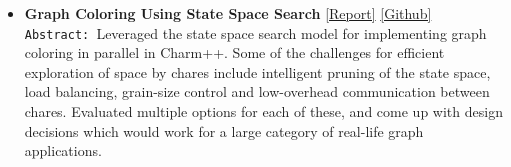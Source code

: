 \documentclass[9pt]{article}
\newenvironment{changemargin}[2]{%
  \begin{list}{}{%
    \setlength{\topsep}{0pt}%
    \setlength{\leftmargin}{#1}%
    \setlength{\rightmargin}{#2}%
    \setlength{\listparindent}{\parindent}%
    \setlength{\itemindent}{\parindent}%
    \setlength{\parsep}{\parskip}%
  }%
  \item[]}{\end{list}
}
\newenvironment{body} {
	\vspace*{-16pt}
	\begin{changemargin}{-0.25in}{-0.5in}
  }	
	{\end{changemargin}
}
\begin{document}
\begin{body}
\begin{itemize}
           \item \textbf{Graph Coloring Using State Space Search} 
           \href{http://webhost.engr.illinois.edu/~sdasgup3/Document/CS598_project_proposal.pdf}{[Report]} 
           \href{https://github.com/sdasgup3/parallel-sudoku}{[Github]} \\          
                                  \texttt{Abstract: }Leveraged the state space
                                  search model for implementing graph coloring
                                  in parallel in Charm++. Some of the
                                  challenges for efficient exploration of space
                                  by chares include intelligent pruning of the
                                  state space, load balancing, grain-size
                                  control and low-overhead communication
                                  between chares. Evaluated multiple options
                                  for each of these, and come up with design
                                  decisions which would work for a large
                                  category of real-life graph applications.
	\end{itemize}
\end{body}

\smallskip
\end{document}
